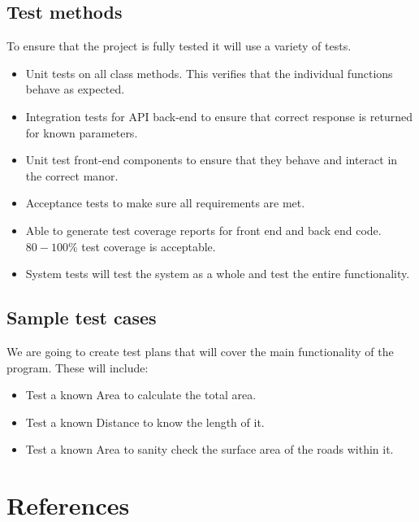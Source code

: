 \documentclass[a4paper,11pt]{article}
\begin{document}
\subsection{Test methods}

To ensure that the project is fully tested it will use a variety of tests.

\begin{itemize}
  \item Unit tests on all class methods. This verifies that the individual
    functions behave as expected.
  \item Integration tests for API back-end to ensure that correct response is
    returned for known parameters.
  \item Unit test front-end components to ensure that they behave and interact
    in the correct manor.
  \item Acceptance tests to make sure all requirements are met.
  \item Able to generate test coverage reports for front end and back end code.
    $80-100\%$ test coverage is acceptable.
  \item System tests will test the system as a whole and test the entire
    functionality.
\end{itemize}

\subsection{Sample test cases}

We are going to create test plans that will cover the main functionality of the
program. These will include:

\begin{itemize}
  \item Test a known Area to calculate the total area.
  \item Test a known Distance to know the length of it.
  \item Test a known Area to sanity check the surface area of the roads within
    it.
\end{itemize}

\pagebreak

\section{References}

\printbibliography{}
\end{document}
